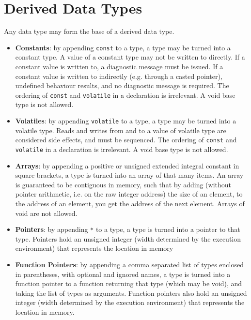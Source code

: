 \documentclass[letterpaper,12pt]{book}
\begin{document}
\section{Derived Data Types}

Any data type may form the base of a derived data type.

\begin{itemize}
	\item \textbf{Constants}: by appending \texttt{const} to a type, a type may be turned into a constant type. A value of a constant type may not be written to directly. If a constant value is written to, a diagnostic message must be issued. If a constant value is written to indirectly (e.g. through a casted pointer), undefined behaviour results, and no diagnostic message is required. The ordering of \texttt{const} and \texttt{volatile} in a declaration is irrelevant. A void base type is not allowed.
	
	\item \textbf{Volatiles}: by appending \texttt{volatile} to a type, a type may be turned into a volatile type. Reads and writes from and to a value of volatile type are considered side effects, and must be sequenced. The ordering of \texttt{const} and \texttt{volatile} in a declaration is irrelevant. A void base type is not allowed.
	
	\item \textbf{Arrays}: by appending a positive or unsigned extended integral constant in square brackets, a type is turned into an array of that many items. An array is guaranteed to be contiguous in memory, such that by adding (without pointer arithmetic, i.e. on the raw integer address) the size of an element, to the address of an element, you get the address of the next element. Arrays of void are not allowed.
	
	\item \textbf{Pointers}: by appending \texttt{*} to a type, a type is turned into a pointer to that type. Pointers hold an unsigned integer (width determined by the execution environment) that represents the location in memory 
	
	\item \textbf{Function Pointers}: by appending a comma separated list of types enclosed in parentheses, with optional and ignored names, a type is turned into a function pointer to a function returning that type (which may be void), and taking the list of types as arguments. Function pointers also hold an unsigned integer (width determined by the execution environment) that represents the location in memory.
\end{itemize}
\end{document}
